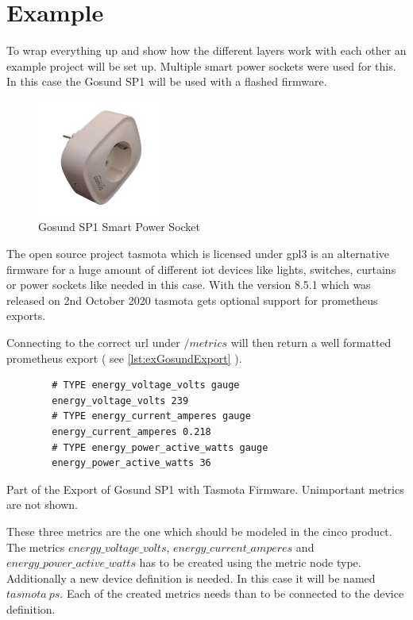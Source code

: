 \section{Example}
To wrap everything up and show how the different layers work with each other an example project will be set up. Multiple smart power sockets were used for this. In this case the Gosund SP1 will be used with a flashed firmware.
\begin{figure}[H]
	\centering
	\includegraphics[width=4cm]{assets/images/gosund.png}
	\caption{Gosund SP1 Smart Power Socket}
\end{figure}
The open source project tasmota \cite{tasmotawebsite} which is licensed under \gls{gpl3} is an alternative firmware for a huge amount of different \gls{iot} devices like lights, switches, curtains or power sockets like needed in this case.
With the version 8.5.1 which was released on 2nd October 2020 tasmota gets optional support for prometheus exports. 

Connecting to the correct \gls{url} under $/metrics$ will then return a well formatted prometheus export ( see \ref{lst:exGosundExport} ).

\begin{listing}[H]
	\begin{verbatim}
		# TYPE energy_voltage_volts gauge
		energy_voltage_volts 239
		# TYPE energy_current_amperes gauge
		energy_current_amperes 0.218
		# TYPE energy_power_active_watts gauge
		energy_power_active_watts 36
	\end{verbatim}
	\caption{Part of the Export of Gosund SP1 with Tasmota Firmware. Unimportant metrics are not shown.}
	\label{lst:exGosundExport}
\end{listing}

These three metrics are the one which should be modeled in the cinco product. The metrics $energy\_voltage\_volts$, $energy\_current\_amperes$ and $energy\_power\_active\_watts$ has to be created using the metric node type. Additionally a new device definition is needed. In this case it will be named $tasmota\ ps$. Each of the created metrics needs than to be connected to the device definition.

